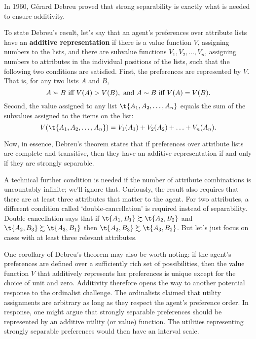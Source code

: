In 1960, G\'erard Debreu proved that strong separability is exactly what is
needed to ensure additivity.

To state Debreu's result, let's say that an agent's preferences over
attribute lists have an \textbf{additive representation} if there is a
value function $V$, assigning numbers to the lists, and there are
subvalue functions $V_1, V_2, \ldots, V_n$, assigning numbers to
attributes in the individual positions of the lists, such that the
following two conditions are satisfied. First, the preferences are
represented by $V$. That is, for any two lists $A$ and $B$,
\[
  A \succ B \text{ iff } V(A) > V(B), \text{ and }A \sim B \text{ iff }V(A) = V(B).
\]
Second, the value assigned to any list $\t{A_1,A_2,\ldots,A_n}$ equals
the sum of the subvalues assigned to the items on the list:
\[
V(\t{A_1,A_2,\ldots,A_n}) = V_1(A_1) + V_2(A_2) + \ldots + V_n(A_n).
\]

Now, in essence, Debreu's theorem states that if preferences over
attribute lists are complete and transitive, then they have an
additive representation if and only if they are strongly separable.

A technical further condition is needed if the number of attribute
combinations is uncountably infinite; we'll ignore that. Curiously,
the result also requires that there are at least three attributes that
matter to the agent. For two attributes, a different condition called
`double-cancellation' is required instead of
separability. Double-cancellation says that if $\t{A_1,B_1} \succsim
\t{A_2,B_2}$ and $\t{A_2,B_3} \succsim \t{A_3,B_1}$ then $\t{A_2,B_3}
\succsim \t{A_3,B_2}$. But let's just focus on cases with at least
three relevant attributes.

One corollary of Debreu's theorem may also be worth noting: if the agent's
preferences are defined over a sufficiently rich set of possibilities, then the
value function $V$ that additively represents her preferences is unique except
for the choice of unit and zero. Additivity therefore opens the way to another
potential response to the ordinalist challenge. The ordinalists claimed that
utility assignments are arbitrary as long as they respect the agent's preference
order. In response, one might argue that strongly separable preferences should
be represented by an additive utility (or value) function. The utilities
representing strongly separable preferences would then have an interval scale.

